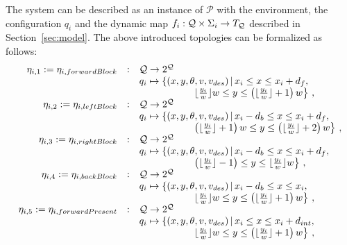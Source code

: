 The system can be described as an instance of $\mathcal{P}$ with the environment, the configuration $q_i$ and the dynamic map $f_i : \mathcal{Q} \times \Sigma_i \rightarrow T_{\mathcal{Q}}$ described in Section~\ref{sec:model}. The above introduced topologies can be formalized as follows:
\begin{equation*}
\begin{array}{rcl}
\eta_{i,1} := \eta_{i, forwardBlock} & : & \Q \rightarrow 2^\Q \\
& & q_i \mapsto \left\lbrace (x,y,\theta, v, v_{des}) \, | \, x_i \leq x \leq x_i + d_f, \right. \\ & & \;\;\;\;\;\;\;\;\;\;\;\;\;\;\;\;\;\;\;\; \left. \lfloor \frac{y_i}{w} \rfloor w \leq y \leq \left( \lfloor \frac{y_i}{w} \rfloor + 1 \right) w \right\rbrace \, , \\
%
\eta_{i,2} := \eta_{i, leftBlock} & : & \Q \rightarrow 2^\Q \\
& & q_i \mapsto \left\lbrace (x,y,\theta, v, v_{des}) \, | \, x_i-d_b \leq x \leq x_i + d_f, \right. \\ & & \;\;\;\;\;\;\;\;\;\;\;\;\;\;\;\;\;\;\;\; \left. \left( \lfloor \frac{y_i}{w} \rfloor + 1 \right) w \leq y \leq \left( \lfloor \frac{y_i}{w} \rfloor + 2 \right) w \right\rbrace \, , \\
%
\eta_{i,3} := \eta_{i, rightBlock} & : & \Q \rightarrow 2^\Q \\
& & q_i \mapsto \left\lbrace (x,y,\theta, v, v_{des}) \, | \, x_i-d_b \leq x \leq x_i + d_f, \right. \\ & & \;\;\;\;\;\;\;\;\;\;\;\;\;\;\;\;\;\;\;\; \left. \left( \lfloor \frac{y_i}{w} \rfloor - 1 \right) \leq y \leq \lfloor \frac{y_i}{w} \rfloor w \right\rbrace \, , \\
%
\eta_{i,4} := \eta_{i, backBlock} & : & \Q \rightarrow 2^\Q \\
& & q_i \mapsto \left\lbrace (x,y,\theta, v, v_{des}) \, | \, x_i-d_b \leq x \leq x_i, \right. \\ & & \;\;\;\;\;\;\;\;\;\;\;\;\;\;\;\;\;\;\;\; \left. \lfloor \frac{y_i}{w} \rfloor w \leq y \leq \left( \lfloor \frac{y_i}{w} \rfloor + 1 \right) w \right\rbrace \, , \\
%
\eta_{i,5} := \eta_{i, forwardPresent} & : & \Q \rightarrow 2^\Q \\
& & q_i \mapsto \left\lbrace (x,y,\theta, v, v_{des}) \, | \, x_i \leq x \leq x_i +d_{int}, \right. \\ & & \;\;\;\;\;\;\;\;\;\;\;\;\;\;\;\;\;\;\;\; \left. \lfloor \frac{y_i}{w} \rfloor w \leq y \leq \left( \lfloor \frac{y_i}{w} \rfloor + 1 \right) w \right\rbrace \, , \\

\end{array}
\end{equation*}
